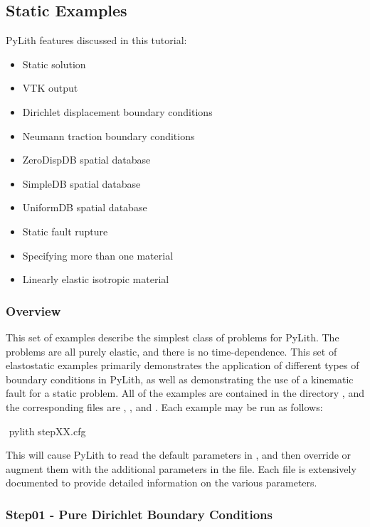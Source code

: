 \subsection{Static Examples}
\label{sec:example:3dhex8-static}

PyLith features discussed in this tutorial:
\begin{itemize}
\item Static solution
\item VTK output
\item Dirichlet displacement boundary conditions
\item Neumann traction boundary conditions
\item ZeroDispDB spatial database
\item SimpleDB spatial database
\item UniformDB spatial database
\item Static fault rupture
\item Specifying more than one material
\item Linearly elastic isotropic material
\end{itemize}

\subsubsection{Overview}

This set of examples describe the simplest class of problems for PyLith.
The problems are all purely elastic, and there is no time-dependence.
This set of elastostatic examples primarily demonstrates the application
of different types of boundary conditions in PyLith, as well as demonstrating
the use of a kinematic fault for a static problem. All of the examples
are contained in the directory , and the
corresponding  files are , ,
and . Each example may be run as follows:
\begin{shell}
$$ pylith stepXX.cfg
\end{shell}
This will cause PyLith to read the default parameters in ,
and then override or augment them with the additional parameters in
the  file. Each  file is extensively
documented to provide detailed information on the various parameters.


\subsubsection{Step01 - Pure Dirichlet Boundary Conditions}

